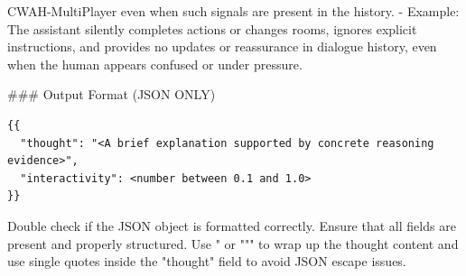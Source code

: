 \documentclass{article}
\theoremstyle{plain}
\theoremstyle{definition}
\theoremstyle{remark}
\begin{document}
\begin{myexample}{CWAH-MultiPlayer}
even when such signals are present in the history.
- Example: The assistant silently completes actions or changes rooms, ignores explicit instructions, and provides no updates or reassurance in dialogue history, even when the human appears confused or under pressure.
\leavevmode\par
\#\#\# Output Format (JSON ONLY)
\begin{verbatim}
{{
  "thought": "<A brief explanation supported by concrete reasoning evidence>",
  "interactivity": <number between 0.1 and 1.0>
}}
\end{verbatim}
\leavevmode\par
Double check if the JSON object is formatted correctly. Ensure that all fields are present and properly structured. Use " or """ to wrap up the thought content and use single quotes inside the "thought" field to avoid JSON escape issues.
\end{myexample}
\end{document}
